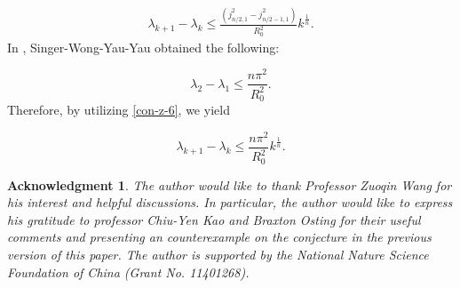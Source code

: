 \documentclass[12pt]{article}
\newtheorem*{ack}{Acknowledgment}
\numberwithin{equation}{section}
\begin{document}
\begin{equation}\begin{aligned} \lambda_{k+1}-\lambda_{k}\leq\frac{\left( j_{n/2,1}^{2}-j_{n/2-1,1}^{2}\right)}{R^{2}_{0}}k^{\frac{1}{n}}.\end{aligned} \end{equation}
In \cite{SWYY}, Singer-Wong-Yau-Yau obtained the following:

\begin{equation}\label{con-z-6} \lambda_{2}-\lambda_{1}\leq \frac{n\pi^{2}}{R^{2}_{0}}.
\end{equation}
Therefore, by utilizing \eqref{con-z-6}, we yield


\begin{equation*} \lambda_{k+1}-\lambda_{k}\leq \frac{n\pi^{2}}{R^{2}_{0}}k^{\frac{1}{n}}.
\end{equation*}

\vskip 5mm

\begin{ack} The author would like to thank Professor Zuoqin Wang  for his interest and helpful discussions. In particular, the author would like to  express his gratitude to professor Chiu-Yen Kao
and Braxton Osting for their useful comments and presenting an counterexample on the conjecture in the previous version of this paper. The author is supported by the National Nature Science Foundation of China (Grant No. 11401268).\end{ack}
\end{document}
